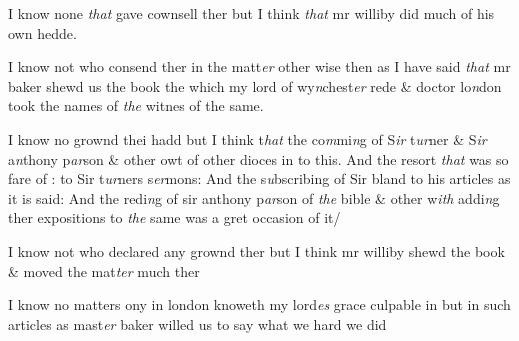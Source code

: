 \documentclass[12pt, a4paper]{book}
\begin{document}
		\ifthenelse{\isodd{\thepage}}
		{\reversemarginpar}
		{\normalmarginpar}
		 I know none \textit{that} gave cownsell ther but I think \textit{that} mr williby did much of his
own hedde.
		
				\marginpar[\vspace{0.5cm}{\textcolor{Gray}{3}}]{}
			
            		
				\marginpar[\vspace{0.5cm}{\textcolor{Gray}{Mr Baker vintomen D. london}}]{}
			
            		
		\ifthenelse{\isodd{\thepage}}
		{\reversemarginpar}
		{\normalmarginpar}
		I know not who consend ther in the matt\textit{er} other wise then as I have said \textit{that}
 mr baker shewd us the book the which my lord of wy\textit{n}chest\textit{er} rede \& doctor lo\textit{n}don
took the names of \textit{the} witnes of the same.
            		
				\marginpar[\vspace{0.5cm}{\textcolor{Gray}{4}}]{}
			
		
		\ifthenelse{\isodd{\thepage}}
		{\reversemarginpar}
		{\normalmarginpar}
		I know no grownd thei hadd but I think t\textit{hat }the co\textit{m}mi\textit{n}g of S\textit{ir} t\textit{ur}ner \& S\textit{ir }a\textit{n}thony
 p\textit{ar}son \& other owt of other dioces in to this. And the resort \textit{that} was so fare
of : to Sir t\textit{ur}ners s\textit{er}mons: And the s\textit{u}bscribing of Sir bland to his articles as it 
is said: And the redi\textit{n}g of sir anthony p\textit{ar}son of \textit{the} bible \& other w\textit{ith} addi\textit{n}g ther
			expositions to \textit{the} same was a gret occasion of it/
		
				\marginpar[\vspace{0.5cm}{\textcolor{Gray}{5}}]{}
			 
		\ifthenelse{\isodd{\thepage}}
		{\reversemarginpar}
		{\normalmarginpar}
		I know not who declared any grownd ther but I think mr williby shewd
the book \& moved the mat\textit{ter} much ther

				\marginpar[\vspace{0.5cm}{\textcolor{Gray}{n 6}}]{}
			
		\ifthenelse{\isodd{\thepage}}
		{\reversemarginpar}
		{\normalmarginpar}
		 I know no matters ony in london knoweth my lord\textit{es} grace  culpable in but 
in such articles as mast\textit{er} baker willed us to say what we hard we did

            		
			
\end{document}
